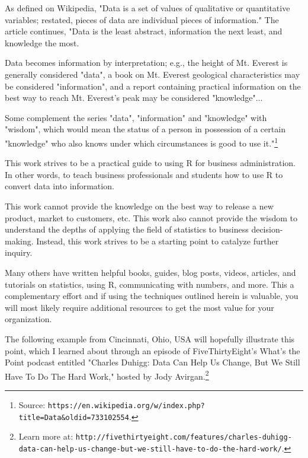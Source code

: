 %
%
%
%
%

As defined on Wikipedia, "Data is a set of values of qualitative or quantitative variables; restated, pieces of data are individual pieces of information." The article continues, "Data is the least abstract, information the next least, and knowledge the most.

Data becomes information by interpretation; e.g., the height of Mt. Everest is generally considered "data", a book on Mt. Everest geological characteristics may be considered "information", and a report containing practical information on the best way to reach Mt. Everest's peak may be considered "knowledge"...

Some complement the series "data", "information" and "knowledge" with "wisdom", which would mean the status of a person in possession of a certain "knowledge" who also knows under which circumstances is good to use it."\footnote{Source: \texttt{https://en.wikipedia.org/w/index.php?title=Data&oldid=733102554}.}

This work strives to be a practical guide to using R for business 
administration. In other words, to teach business professionals and students how to use R to convert data into information.

This work cannot provide the knowledge on the best way to release a new product, market to customers, etc. This work also cannot provide the wisdom to understand the depths of applying the field of statistics to business decision-making. Instead, this work strives to be a starting point to catalyze further inquiry.

Many others have written helpful books, guides, blog posts, videos, articles, and tutorials on statistics, using R, communicating with numbers, and more. This a complementary effort and if using the techniques outlined herein is valuable, you will most likely require additional resources to get the most value for your organization.

The following example from Cincinnati, Ohio, USA will hopefully illustrate this point, which I learned about through an episode of FiveThirtyEight's What's the Point podcast entitled "Charles Duhigg: Data Can Help Us Change, But We Still Have To Do The Hard Work," hosted by Jody Avirgan.\footnote{Learn more at: \texttt{http://fivethirtyeight.com/features/charles-duhigg-data-can-help-us-change-but-we-still-have-to-do-the-hard-work/}.} 

